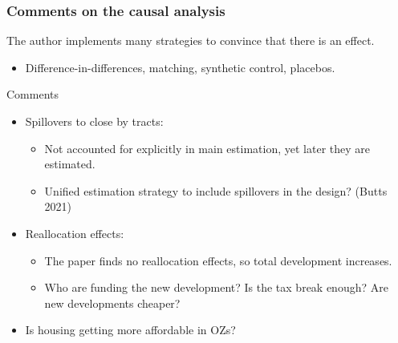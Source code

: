 \documentclass[aspectratio=169, t]{beamer}
\begin{document}
\begin{frame}
    \frametitle{Comments on the causal analysis}
    
    The author implements many strategies to convince that there is an effect.
    \begin{itemize}
        \item Difference-in-differences, matching, synthetic control, placebos.
    \end{itemize}

    \pause
    \vspace{2mm}
    Comments
    \begin{itemize}
        \vspace{1mm}
        \item Spillovers to close by tracts:
        \begin{itemize}
            \item Not accounted for explicitly in main estimation, yet later they are estimated.
            \item Unified estimation strategy to include spillovers in the design? (Butts 2021)
        \end{itemize}
        \pause
        \vspace{1mm}
        \item Reallocation effects:
        \begin{itemize}
            \item The paper finds no reallocation effects, so total development increases.
            \item Who are funding the new development? Is the tax break enough? Are new developments cheaper?
        \end{itemize}
        \pause
        \vspace{1mm}
        \item Is housing getting more affordable in OZs?
    \end{itemize}
\end{frame}
\end{document}

